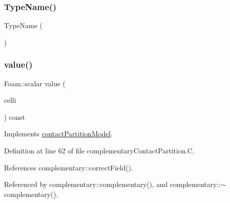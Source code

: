 \subsubsection{\texorpdfstring{Type\+Name()}{TypeName()}}
{\footnotesize\ttfamily Type\+Name (\begin{DoxyParamCaption}\item[{\char`\"{}complementary\char`\"{}}]{ }\end{DoxyParamCaption})}

\mbox{\label{classFoam_1_1contactPartitionModels_1_1complementary_a2c1e1872d359910de4c35cf8f003871c}} 
\subsubsection{\texorpdfstring{value()}{value()}}
{\footnotesize\ttfamily Foam\+::scalar value (\begin{DoxyParamCaption}\item[{const label \&}]{celli }\end{DoxyParamCaption}) const\hspace{0.3cm}{\ttfamily [virtual]}}



Implements \hyperlink{classFoam_1_1contactPartitionModel_a139457cae4c5e04785e143fd8b9ed092}{contact\+Partition\+Model}.



Definition at line 62 of file complementary\+Contact\+Partition.\+C.



References complementary\+::correct\+Field().



Referenced by complementary\+::complementary(), and complementary\+::$\sim$complementary().

